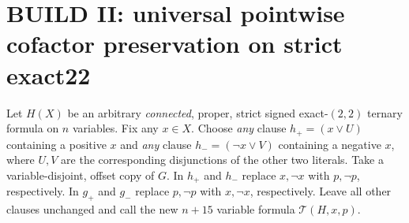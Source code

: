 \documentclass[11pt]{article}
\begin{document}
\section{BUILD II: universal pointwise cofactor preservation on strict exact22}
Let $H(X)$ be an arbitrary \emph{connected}, proper, strict signed exact-$(2,2)$ ternary formula on $n$ variables. Fix any $x\in X$. Choose \emph{any} clause $h_+=(x\vee U)$ containing a positive $x$ and \emph{any} clause $h_-=(\neg x\vee V)$ containing a negative $x$, where $U,V$ are the corresponding disjunctions of the other two literals. Take a variable-disjoint, offset copy of $G$. In $h_+$ and $h_-$ replace $x,\neg x$ with $p,\neg p$, respectively. In $g_+$ and $g_-$ replace $p,\neg p$ with $x,\neg x$, respectively. Leave all other clauses unchanged and call the new $n+15$ variable formula $\mathcal T(H,x,p)$.
\end{document}
